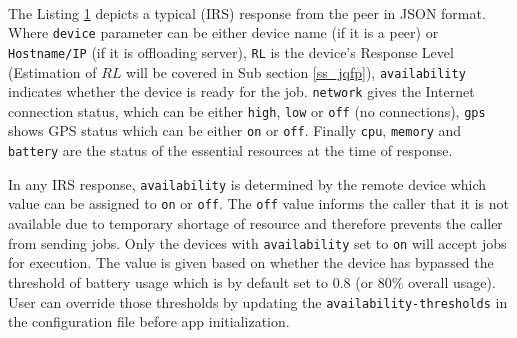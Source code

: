 \documentclass{sig-alternate}[10pt]
\begin{document}
\begin{figure}
\noindent {}	\\
\noindent {}	

\label{code:jsonResponse}

\end{figure}

The Listing \ref{code:jsonResponse} depicts a typical (IRS) response from the peer in JSON format. Where \texttt{device} parameter can be either device name (if it is a peer) or \texttt{Hostname/IP} (if it is offloading server), \texttt{RL} is the device's Response Level (Estimation of $RL$ will be covered in Sub section \ref{ss_jqfp}), \texttt{availability} indicates whether the device is ready for the job. \texttt{network} gives the Internet connection status, which can be either \texttt{high}, \texttt{low} or \texttt{off} (no connections), \texttt{gps} shows GPS status which can be either \texttt{on} or \texttt{off}. Finally \texttt{cpu}, \texttt{memory} and \texttt{battery} are the status of the essential resources at the time of response. 

In any IRS response, \texttt{availability} is determined by the remote device which value can be assigned to \texttt{on} or \texttt{off}. The \texttt{off} value informs the caller that it is not available due to temporary shortage of resource and therefore prevents the caller from sending jobs. Only the devices with \texttt{availability} set to \texttt{on} will accept jobs for execution. The value is given based on whether the device has bypassed the threshold of battery usage which is by default set to 0.8 (or 80\% overall usage). User can override those thresholds by updating the \texttt{availability-thresholds} in the configuration file before app initialization. 
\end{document}

